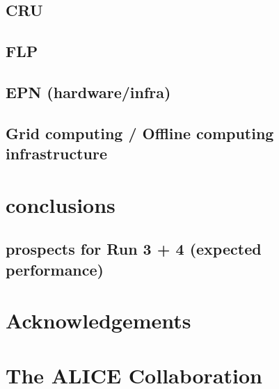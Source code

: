 \documentclass[ALICE,manyauthors]{cernphprep}
\begin{document}
\subsection{CRU}
\subsection{FLP}
\subsection{EPN (hardware/infra)}
\subsection{Grid computing / Offline computing infrastructure}

\section{conclusions}
\subsection{prospects for Run 3 + 4 (expected performance)}

\cleardoublepage
\newenvironment{acknowledgement}{\relax}{\relax}
\begin{acknowledgement}
\section*{Acknowledgements}
%
\end{acknowledgement}



\newpage
\appendix

%
%

\section{The ALICE Collaboration}
\label{app:collab}
%
\end{document}
